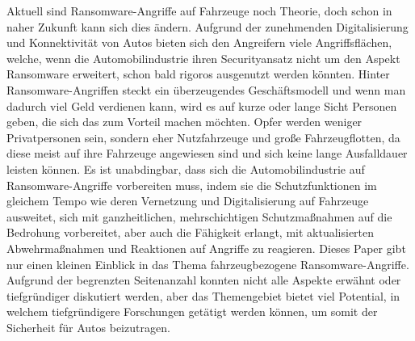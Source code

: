 Aktuell sind Ransomware-Angriffe auf Fahrzeuge noch Theorie, doch schon in naher 
Zukunft kann sich dies ändern. Aufgrund der zunehmenden Digitalisierung und Konnektivität 
von Autos bieten sich den Angreifern viele Angriffsflächen, welche, wenn die Automobilindustrie 
ihren Securityansatz nicht um den Aspekt Ransomware erweitert, schon bald rigoros ausgenutzt 
werden könnten. Hinter Ransomware-Angriffen steckt ein überzeugendes Geschäftsmodell und wenn 
man dadurch viel Geld verdienen kann, wird es auf kurze oder lange Sicht Personen geben, die 
sich das zum Vorteil machen möchten.
\newline
Opfer werden weniger Privatpersonen sein, sondern eher Nutzfahrzeuge und große Fahrzeugflotten, 
da diese meist auf ihre Fahrzeuge angewiesen sind und sich keine lange Ausfalldauer leisten können.
\newline
Es ist unabdingbar, dass sich die Automobilindustrie auf Ransomware-Angriffe vorbereiten muss, 
indem sie die Schutzfunktionen im gleichem Tempo wie deren Vernetzung und Digitalisierung
auf Fahrzeuge ausweitet, sich mit ganzheitlichen, 
mehrschichtigen Schutzmaßnahmen auf die Bedrohung vorbereitet, aber auch die Fähigkeit erlangt, mit 
aktualisierten Abwehrmaßnahmen und Reaktionen auf Angriffe zu reagieren.
\newline
Dieses Paper gibt nur einen kleinen Einblick in das Thema fahrzeugbezogene Ransomware-Angriffe. 
Aufgrund der begrenzten Seitenanzahl konnten nicht alle Aspekte erwähnt oder tiefgründiger diskutiert 
werden, aber das Themengebiet bietet viel Potential, in welchem tiefgründigere Forschungen 
getätigt werden können, um somit der Sicherheit für Autos beizutragen. 
